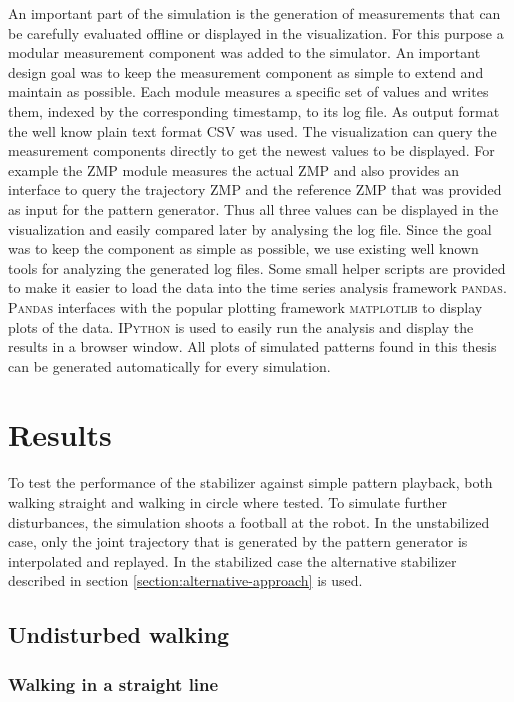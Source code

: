 \documentclass[english,ngerman]{KITreprt}
\newcommand{\name}[1]{\textsc{#1}}
\begin{document}
An important part of the simulation is the generation of measurements
that can be carefully evaluated offline or displayed in the
visualization. For this purpose a modular measurement component was
added to the simulator. An important design goal was to keep the
measurement component as simple to extend and maintain as possible. Each
module measures a specific set of values and writes them, indexed by the
corresponding timestamp, to its log file. As output format the well know
plain text format CSV was used. The visualization can query the
measurement components directly to get the newest values to be
displayed. For example the ZMP module measures the actual ZMP and also
provides an interface to query the trajectory ZMP and the reference ZMP
that was provided as input for the pattern generator. Thus all three
values can be displayed in the visualization and easily compared later
by analysing the log file. Since the goal was to keep the component as
simple as possible, we use existing well known tools for analyzing the
generated log files. Some small helper scripts are provided to make it
easier to load the data into the time series analysis framework
\name{pandas}. \name{Pandas} interfaces with the popular plotting
framework \name{matplotlib} to display plots of the data. \name{IPython}
is used to easily run the analysis and display the results in a browser
window. All plots of simulated patterns found in this thesis can be
generated automatically for every simulation.

\chapter{Results}\label{results}

To test the performance of the stabilizer against simple pattern
playback, both walking straight and walking in circle where tested. To
simulate further disturbances, the simulation shoots a football at the
robot. In the unstabilized case, only the joint trajectory that is
generated by the pattern generator is interpolated and replayed. In the
stabilized case the alternative stabilizer described in section
\ref{section:alternative-approach} is used.

\section{Undisturbed walking}\label{undisturbed-walking}

\subsection{Walking in a straight
line}\label{walking-in-a-straight-line}
\end{document}
